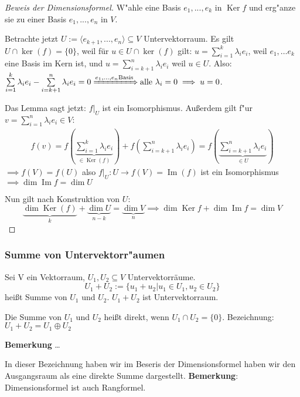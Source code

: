 \documentclass[11pt]{article}
\DeclareMathOperator{\mdim}{dim}
\DeclareMathOperator{\mKer}{Ker}
\DeclareMathOperator{\mIm}{Im}
\begin{document}
\begin{proof}[Beweis der Dimensionsformel] \label{}
W"ahle eine Basis \({e_1, ..., e_k}\) in \(\mKer f\) und erg"anze sie zu einer Basis
\({e_1, ..., e_n}\) in \(V\).

Betrachte jetzt \(U:=\langle e_{k+1}, ..., e_n\rangle \subseteq V\) Untervektorraum. Es gilt $U \cap \ker(f) = \{0\}$, weil für $u\in U \cap \ker(f)$ gilt: \(u = \sum\limits_{i=1}^k \lambda_ie_i \), weil \(e_1, \dots e_k\) eine Basis im Kern ist, und \(u = \sum\limits_{i=k+1}^{n} \lambda_i e_i\) weil \(u\in U\). Also: \(\sum\limits_{i=1}^k \lambda_ie_i - \sum\limits_{i=k+1}^{n} \lambda_ie_i = 0 \xRightarrow{e_1,\dots, e_n \text{Basis}} \text{alle }\lambda_i = 0 \implies u =0\).

Das Lemma sagt jetzt: \(f|_U\) ist ein Isomorphismus. Außerdem gilt f"ur \(v =\sum\limits_{i=1}^{n}\lambda_ie_i \in V:\)
\begin{align*}
f(v) = f\left(\underbrace{\sum_{i=1}^{k}\lambda_ie_i}_{\in \mKer(f)}\right) + f\left(\sum_{i=k+1}^{n}\lambda_ie_i\right) = f\left(\underbrace{\sum_{i=k+1}^{n} \lambda_ie_i}_{\in U}\right)
\end{align*}
\(\implies f(V)=f(U)\) also \(f|_U : U\to f(V) = \mIm(f) \) ist ein Isomorphismus \(\implies \mdim \mIm f = \mdim U \)

Nun gilt nach Konstruktion von \(U\): \[\underbrace{\mdim \mKer(f)}_{k} + \underbrace{\mdim U}_{n-k} = \underbrace{\mdim V}_{n} \implies \mdim\mKer f + \mdim\mIm f = \mdim V \]
\end{proof}

\subsubsection{Summe von Untervektorr"aumen}
\label{sec:org83dfe63}
\begin{definition}{}{}
	Sei V ein Vektorraum, $U_1, U_2 \subseteq V$ Untervektorräume.
	\[U_1 + U_2 := \{u_1+u_2 | u_1 \in U_1, u_2 \in U_2\}\]
	heißt Summe von $U_1$ und $U_2$.
	$U_1 + U_2$ ist Untervektorraum.
	
\end{definition}
\begin{definition}{}{}
Die Summe von $U_1$ und $U_2$ heißt direkt, wenn $U_1 \cap U_2 = \{0\}$. Bezeichnung: $U_1 + U_2 = U_1 \oplus U_2$
\end{definition}

\textbf{Bemerkung} \ldots{}

In dieser Bezeichnung haben wir im Beseris der Dimensionsformel haben wir den
Ausgangsraum als eine direkte Summe dargestellt. 
\textbf{Bemerkung}: Dimensionsformel ist auch Rangformel.
\end{document}
